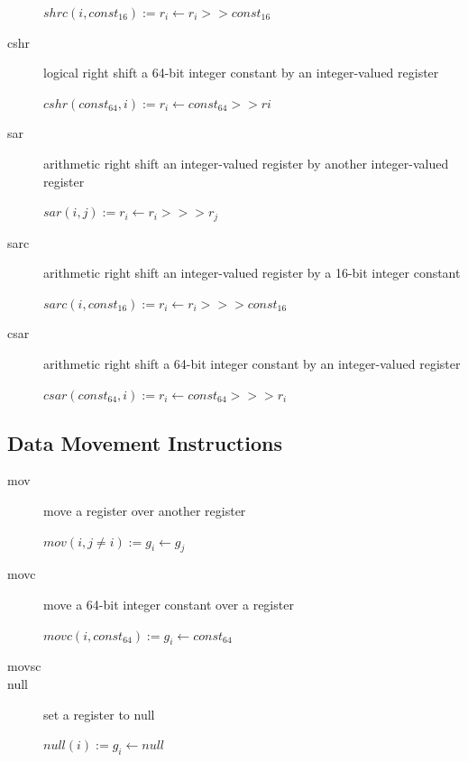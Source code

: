 \documentclass[english,a4paper]{article}
\begin{document}
\begin{description}
	$shrc(i, const _{16}) :=  r _{i} \longleftarrow  r _{i} >> const 
	_{16} $ \\
	\item[cshr] logical right shift a 64-bit integer constant by an
	integer-valued register
	
	$cshr(const _{64}, i):=  r _{i} \longleftarrow  const _{64} >> 
	r{i}  $  \\
	\item[sar] arithmetic right shift an integer-valued register by
	another integer-valued register
	
	$sar(i, j) :=  r _{i} \longleftarrow  r _{i} >>> r _{j} $  \\
	\item[sarc] arithmetic right shift an integer-valued register by a
	16-bit integer constant
	
	$sarc(i, const _{16}) :=  r _{i} \longleftarrow  r _{i} >>> const 
	_{16} $ \\
	\item[csar] arithmetic right shift a 64-bit integer constant by an
	integer-valued register
	
	$csar(const _{64}, i):=  r _{i} \longleftarrow  const _{64} >>> r 
	_{i}  $ \\
\end{description}

\subsection{Data Movement Instructions}
\begin{description}
	\item[mov] move a register over another register
	
	$mov(i, j \neq i) := g_{i} \longleftarrow g_{j} $ \\
	\item[movc] move a 64-bit integer constant over a register
	
	$movc(i, const_{64}):= g_{i} \longleftarrow const_{64} $ \\
	
	\item[movsc]
	
	\item[null] set a register to null
	
	$null(i):= g_{i} \longleftarrow null $ \\
\end{description}
\end{document}
